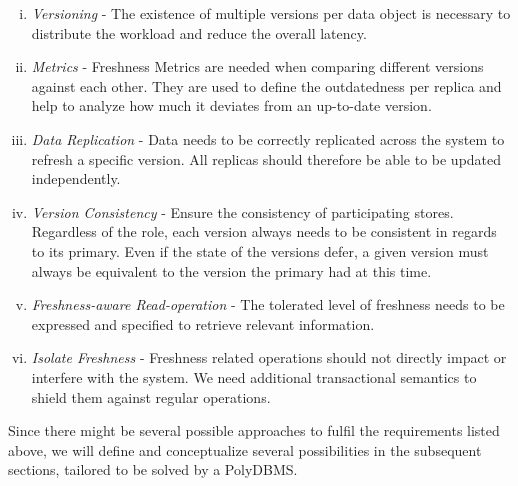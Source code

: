 \begin{enumerate}[(i)]
    \item \textit{Versioning} -                     The existence of multiple versions per data object is necessary to distribute the workload 
                                                    and reduce the overall latency.

    \item \textit{Metrics} -                        Freshness Metrics are needed when comparing different versions against each other.
                                                    They are used to define the outdatedness per replica and help to analyze how much it deviates from an up-to-date version.

    \item \textit{Data Replication} -               Data needs to be correctly replicated across the system to refresh a specific version.
                                                    All replicas should therefore be able to be updated independently.

    \item \textit{Version Consistency} -            Ensure the consistency of participating stores. Regardless of the role, each version always needs 
                                                    to be consistent in regards to its primary. Even if the state of the versions defer, 
                                                    a given version must always be equivalent to the version the primary had at this time.
                                            
    \item \textit{Freshness-aware Read-operation} - The tolerated level of freshness needs to be expressed and specified to retrieve relevant information.
    
    \item \textit{Isolate Freshness} -              Freshness related operations should not directly impact or interfere with the system. 
                                                    We need additional transactional semantics to shield them against regular operations.                                    

\end{enumerate}

Since there might be several possible approaches to fulfil the requirements listed above, 
we will define and conceptualize several possibilities in the subsequent sections, tailored to be solved by a PolyDBMS. 


